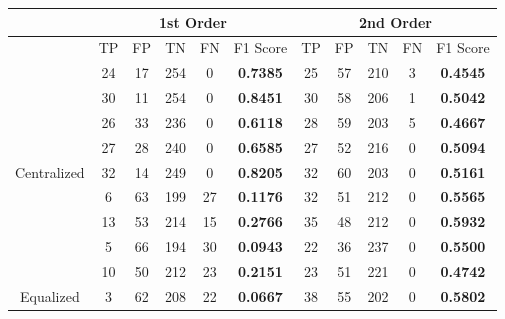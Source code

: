 \documentclass[10pt,a4paper]{article}
\begin{document}
		\begin{table}[!h]
			\centering
			\begin{tabular}{|c|c|c|c|c|c|c|c|c|c|c|}
				\hline
				& \multicolumn{5}{c|}{1st Order}                                                     & \multicolumn{5}{c|}{2nd Order}                              \\ \hline
				& TP & FP & TN  & FN                        & F1 Score                               & TP & FP & TN  & FN & F1 Score                               \\ \hline
				& 24 & 17 & 254 & {\color[HTML]{333333} 0}  & {\color[HTML]{FE0000} \textbf{0.7385}} & 25 & 57 & 210 & 3  & {\color[HTML]{FE0000} \textbf{0.4545}} \\ \cline{2-11} 
				& 30 & 11 & 254 & {\color[HTML]{333333} 0}  & {\color[HTML]{FE0000} \textbf{0.8451}} & 30 & 58 & 206 & 1  & {\color[HTML]{FE0000} \textbf{0.5042}} \\ \cline{2-11} 
				& 26 & 33 & 236 & {\color[HTML]{333333} 0}  & {\color[HTML]{FE0000} \textbf{0.6118}} & 28 & 59 & 203 & 5  & {\color[HTML]{FE0000} \textbf{0.4667}} \\ \cline{2-11} 
				& 27 & 28 & 240 & {\color[HTML]{333333} 0}  & {\color[HTML]{FE0000} \textbf{0.6585}} & 27 & 52 & 216 & 0  & {\color[HTML]{FE0000} \textbf{0.5094}} \\ \cline{2-11} 
				\multirow{-5}{*}{Centralized} & 32 & 14 & 249 & {\color[HTML]{333333} 0}  & {\color[HTML]{FE0000} \textbf{0.8205}} & 32 & 60 & 203 & 0  & {\color[HTML]{FE0000} \textbf{0.5161}} \\ \hline
				& 6  & 63 & 199 & {\color[HTML]{333333} 27} & {\color[HTML]{FE0000} \textbf{0.1176}} & 32 & 51 & 212 & 0  & {\color[HTML]{FE0000} \textbf{0.5565}} \\ \cline{2-11} 
				& 13 & 53 & 214 & {\color[HTML]{333333} 15} & {\color[HTML]{FE0000} \textbf{0.2766}} & 35 & 48 & 212 & 0  & {\color[HTML]{FE0000} \textbf{0.5932}} \\ \cline{2-11} 
				& 5  & 66 & 194 & {\color[HTML]{333333} 30} & {\color[HTML]{FE0000} \textbf{0.0943}} & 22 & 36 & 237 & 0  & {\color[HTML]{FE0000} \textbf{0.5500}} \\ \cline{2-11} 
				& 10 & 50 & 212 & {\color[HTML]{333333} 23} & {\color[HTML]{FE0000} \textbf{0.2151}} & 23 & 51 & 221 & 0  & {\color[HTML]{FE0000} \textbf{0.4742}} \\ \cline{2-11} 
				\multirow{-5}{*}{Equalized}   & 3  & 62 & 208 & {\color[HTML]{333333} 22} & {\color[HTML]{FE0000} \textbf{0.0667}} & 38 & 55 & 202 & 0  & {\color[HTML]{FE0000} \textbf{0.5802}} \\ \hline
			\end{tabular}
		\end{table}
		
\end{document}
